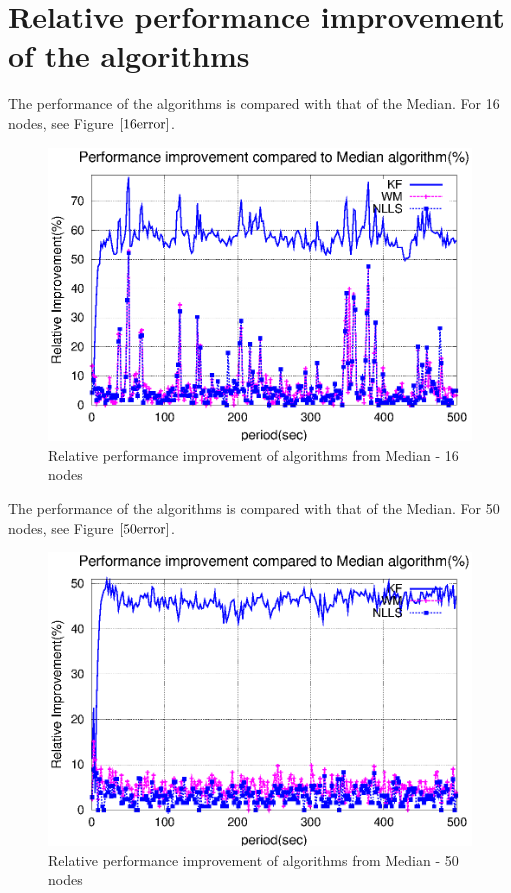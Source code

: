 \documentclass[a4paper,10pt]{report}
\begin{document}
\section{Relative performance improvement of the algorithms}
The performance of the algorithms is compared with that of the Median. For 16 nodes, see Figure $\ref{16error}$.
\begin{figure}[!h]
\centering
\includegraphics[width= 0.7 \textwidth]{16output-error}
\caption{Relative performance improvement of algorithms from Median - 16 nodes} \label{16error}
\end{figure}
The performance of the algorithms is compared with that of the
Median. For 50 nodes, see Figure $\ref{50error}$.
\begin{figure}[!h]
\centering
\includegraphics[width=0.7  \textwidth]{50output-error}
\caption{Relative performance improvement of algorithms from Median - 50 nodes} \label{50error}
\end{figure}
\end{document}
